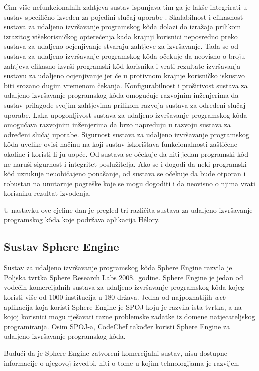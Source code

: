 \documentclass[times, utf8, diplomski]{fer}
\begin{document}
Čim više nefunkcionalnih zahtjeva sustav ispunjava tim ga je lakše integrirati u sustav specifično izveden za pojedini slučaj uporabe \citep{9245310}. Skalabilnost i efikasnost sustava za udaljeno izvršavanje programskog kôda dolazi do izražaja prilikom izrazitog višekorisničkog opterećenja kada krajnji korisnici neposredno preko sustava za udaljeno ocjenjivanje stvaraju zahtjeve za izvršavanje. Tada se od sustava za udaljeno izvršavanje programskog kôda očekuje da neovisno o broju zahtjeva efikasno izvrši programski kôd korisnika i vrati rezultate izvršavanja sustavu za udaljeno ocjenjivanje jer će u protivnom krajnje korisničko iskustvo biti srozano dugim vremenom čekanja. Konfigurabilnost i proširivost sustava za udaljeno izvršavanje programskog kôda omogućuje razvojnim inženjerima da sustav prilagode svojim zahtjevima prilikom razvoja sustava za određeni slučaj uporabe. Laka upogonljivost sustava za udaljeno izvršavanje programskog kôda omogućava razvojnim inženjerima da brzo napreduju u razvoju sustava za određeni slučaj uporabe. Sigurnost sustava za udaljeno izvršavanje programskog kôda uvelike ovisi načinu na koji sustav iskorištava funkcionalnosti zaštićene okoline i koristi li ju uopće. Od sustava se očekuje da niti jedan programski kôd ne naruši sigurnost i integritet poslužitelja. Ako se i dogodi da neki programski kôd uzrukuje neuobičajeno ponašanje, od sustava se očekuje da bude otporan i robustan na unutarnje pogreške koje se mogu dogoditi i da neovisno o njima vrati korisniku rezultat izvođenja.

U nastavku ove cjeline dan je pregled tri različita sustava za udaljeno izvršavanje programskog kôda koje podržava aplikacija Hélory.

\subsection{Sustav Sphere Engine}
Sustav za udaljeno izvršavanje programskog kôda Sphere Engine razvila je Poljska tvrtka Sphere Research Labs 2008.\ godine. Sphere Engine je jedan od vodećih komercijalnih sustava za udaljeno izvršavanje programskog kôda kojeg koristi više od 1000 institucija u 180 država. Jedna od najpoznatijih \textit{web} aplikacija koja koristi Sphere Engine je SPOJ \citep{SPOJ} koju je razvila ista tvrtka, a na kojoj korisnici mogu rješavati razne problemske zadatke iz domene natjecateljskog programiranja. Osim SPOJ-a, CodeChef \citep{CodeChef} također koristi Sphere Engine za udaljeno izvršavanje programskog kôda.

Budući da je Sphere Engine zatvoreni komercijalni sustav, nisu dostupne informacije o njegovoj izvedbi, niti o tome u kojim tehnologijama je razvijen.
\end{document}
